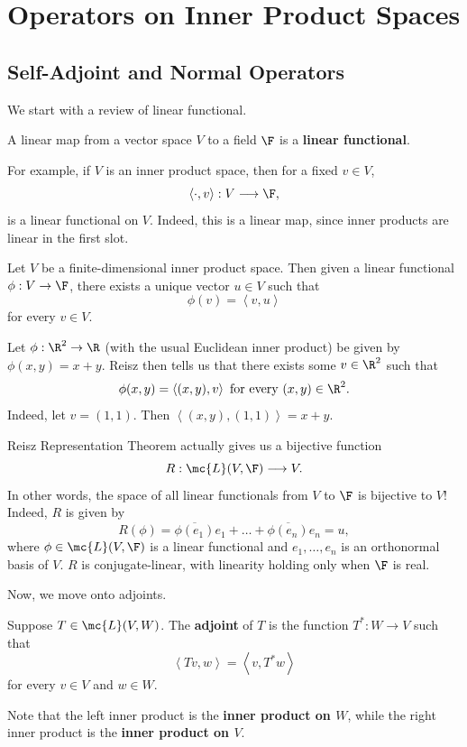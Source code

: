 \documentclass[math0540-lecture-notes.tex]{subfiles}
\begin{document}
\chapter{Operators on Inner Product Spaces}

\section{Self-Adjoint and Normal Operators}

We start with a review of linear functional.

\begin{definition}{}
  A linear map from a vector space $V$ to a field $\F$ is a \textbf{linear functional}.
\end{definition}
For example, if $V$ is an inner product space, then for a fixed $v\in V$, \[
  \left<\cdot , v \right> :V\longrightarrow \F
,\] is a linear functional on $V$. Indeed, this is a linear map, since inner products are linear in
the first slot.

\begin{theorem}{}
  Let $V$ be a finite-dimensional inner product space. Then given a linear functional $\phi:V\to
  \F$, there exists a unique vector $u\in V$ such that \[
    \phi(v)=\left<v,u \right> 
  \] for every $v\in V$.
\end{theorem}

\begin{example}
  Let $\phi:\R^2\to \R$ (with the usual Euclidean inner product) be given by $\phi(x,y)=x+y$. Reisz
  then tells us that there exists some $v\in \R^2$ such that \[
    \phi(x,y)=\left<(x,y),v \right> ~\text{for every}~(x,y)\in \R^2
  .\] Indeed, let $v=(1,1)$. Then $\left<(x,y),(1,1) \right> =x+y$.
\end{example}

Reisz Representation Theorem actually gives us a bijective function \[
  R:\mc{L}(V,\F)\longrightarrow V
.\] In other words, the space of all linear functionals from $V$ to $\F$ is bijective to $V$!
Indeed, $R$ is given by \[
  R(\phi)=\overline{\phi(e_1)}e_1+\ldots+\overline{\phi(e_n)}e_n=u
,\] where $\phi\in \mc{L}(V,\F)$ is a linear functional and $e_1,\ldots,e_n$ is an orthonormal basis
of $V$. $R$ is conjugate-linear, with linearity holding only when $\F$ is real.

Now, we move onto adjoints.
\begin{definition}[Adjoint, $T^*$]{}
  Suppose $T\in \mc{L}(V,W)$. The \textbf{adjoint} of $T$ is the function $T^*:W\to V$ such that \[
    \left<Tv,w \right> =\left<v,T^*w \right> 
  \] for every $v\in V$ and $w\in W$.

  Note that the left inner product is the \textbf{inner product on $W$}, while the right inner
  product is the \textbf{inner product on $V$}.
\end{definition}
\end{document}
